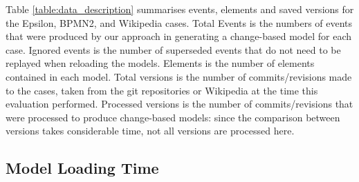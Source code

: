 \documentclass{llncs}
\begin{document}
    Table \ref{table:data_description} summarises events, elements and saved versions for the Epsilon, BPMN2, and Wikipedia cases. Total Events is the numbers of events that were produced by our approach in generating a change-based model for each case.  Ignored events is the number of superseded events that do not need to be replayed when reloading the models. Elements is the number of elements contained in each model. Total versions is the number of commits/revisions made to the cases, taken from the git repositories or Wikipedia at the time this evaluation performed. Processed versions is the number of commits/revisions that were processed to produce change-based models: since the comparison between versions takes considerable time, not all versions are processed here. 
    
    \subsection{Model Loading Time}
    \label{subsec:loading_time_test}
    
\end{document}
